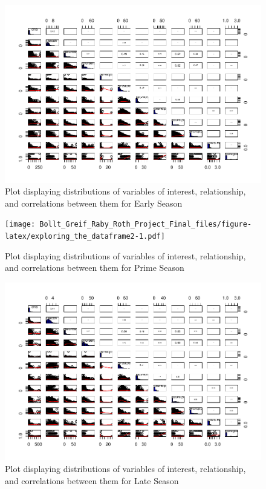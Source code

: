 \documentclass[12pt,]{article}
\begin{document}
\begin{figure}
\centering
\includegraphics{Bollt_Greif_Raby_Roth_Project_Final_files/figure-latex/exploring_the_dataframe1-1.pdf}
\caption{Plot displaying distributions of variables of interest,
relationship, and correlations between them for Early Season}
\end{figure}

\begin{figure}
\centering
\texttt{[image: Bollt\_Greif\_Raby\_Roth\_Project\_Final\_files/figure-latex/exploring\_the\_dataframe2-1.pdf]}
\caption{Plot displaying distributions of variables of interest,
relationship, and correlations between them for Prime Season}
\end{figure}

\begin{figure}
\centering
\includegraphics{Bollt_Greif_Raby_Roth_Project_Final_files/figure-latex/exploring_the_dataframe3-1.pdf}
\caption{Plot displaying distributions of variables of interest,
relationship, and correlations between them for Late Season}
\end{figure}
\end{document}

